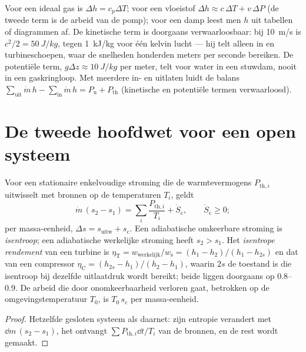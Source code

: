 \begin{remark}\label{rem:b2:open-systems:using}
Voor een ideaal gas is $\Delta h = c_p\Delta T$; voor een vloeistof
$\Delta h \approx
c\,\Delta T + v\,\Delta P$ (de tweede term is de arbeid
van de pomp); voor een damp
leest men $h$ uit tabellen of diagrammen af. De kinetische term is doorgaans
verwaarloosbaar: bij \qty{10}{m/s} is $c^2/2 = \qty{50}{J/kg}$, tegen
\qty{1}{kJ/kg} voor één kelvin lucht --- hij telt alleen in  en
turbineschoepen, waar de snelheden honderden meters per seconde bereiken. De
potentiële term, $g\Delta z \approx \qty{10}{J/kg}$ per meter, telt voor
water in een stuwdam, nooit in een gaskringloop. Met meerdere in- en uitlaten
luidt de balans
$\sum_{\text{uit}}\dot m\,h - \sum_{\text{in}}\dot m\,h =
P_{\text{u}} + P_{\text{th}}$
(kinetische en potentiële termen verwaarloosd).
\end{remark}

\section{De tweede hoofdwet voor een open systeem}

\begin{theorem}\label{thm:b2:open-systems:secondlaw}
Voor een stationaire enkelvoudige stroming die de warmtevermogens
$P_{\text{th},i}$ uitwisselt met bronnen op de temperaturen $T_i$, geldt
\[
\dot m\,(s_2 - s_1) = \sum_i\frac{P_{\text{th},i}}{T_i} + \dot S_{\text{c}},
\qquad \dot S_{\text{c}} \ge 0 ;
\]
per massa-eenheid, $\Delta s = s_{\text{uitw}} + s_{\text{c}}$. Een adiabatische
omkeerbare stroming is \emph{isentroop}; een adiabatische werkelijke
stroming heeft $s_2 >
s_1$. Het \emph{isentrope rendement} van
een turbine is
$\eta_{\text{T}} = w_{\text{werkelijk}}/w_{\text{s}} = (h_1 - h_2)/(h_1
- h_{2s})$
en dat van een compressor $\eta_{\text{C}} = (h_{2s} - h_1)/(h_2 -
h_1)$,
waarin $2s$ de toestand is die isentroop bij dezelfde
uitlaatdruk wordt bereikt; beide liggen doorgaans op $0.8$--$0.9$. De arbeid
die door onomkeerbaarheid verloren gaat, betrokken op de
omgevingstemperatuur $T_0$, is
$T_0\,s_{\text{c}}$ per massa-eenheid.
\end{theorem}

\begin{proof}
Hetzelfde gesloten systeem als daarnet: zijn entropie verandert met
$\dd m\,(s_2 -
s_1)$, het ontvangt $\sum P_{\text{th},i}\dd t/T_i$ van de
bronnen, en de
rest wordt gemaakt.
\end{proof}

